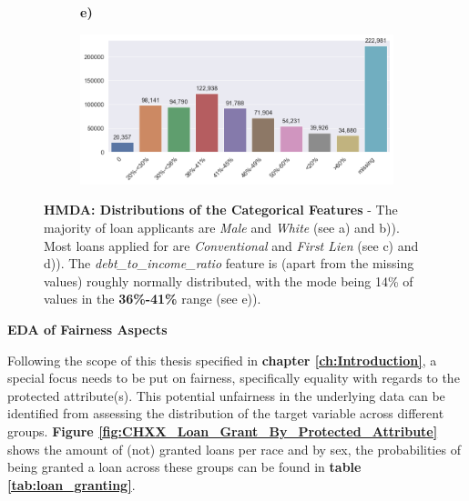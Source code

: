 \begin{figure}[!htbp]
\begin{minipage}[b]{0.5\textwidth}
\begin{subfigure}[t]{0.9\textwidth}
        \end{subfigure}
    \end{minipage}%
    \hfill\allowbreak%
    \begin{minipage}[b]{1\textwidth}
        \centering
        \begin{subfigure}[t]{0.06\textwidth}
            \textbf{e)}
        \end{subfigure}
        \begin{subfigure}[t]{0.92\textwidth}
            \includegraphics[width=\linewidth, valign=t]{images/HMDA_features/HMDA_features_dtir.png}
        \end{subfigure}
    \end{minipage}%

    \caption[HMDA: Distributions of the Categorical Features]{\textbf{HMDA: Distributions of the Categorical Features} - The majority of loan applicants are \textit{Male} and \textit{White} (see a) and b)). 
    Most loans applied for are \textit{Conventional} and \textit{First Lien} (see c) and d)). The \textit{debt\_to\_income\_ratio} feature is (apart from the missing values) roughly normally distributed, with the mode being 14\% of values in the \textbf{36\%-41\%} range (see e)).}
    \label{fig:HMDA_Categorical_Features_Distributions}

\end{figure}


\textbf{EDA of Fairness Aspects}

Following the scope of this thesis specified in \textbf{chapter \ref{ch:Introduction}}, a special focus needs to be put  on fairness, specifically equality with regards to the protected attribute(s).
This potential unfairness in the underlying data can be identified from assessing the distribution of the target variable across different groups.
\textbf{Figure \ref{fig:CHXX_Loan_Grant_By_Protected_Attribute}} shows the amount of (not) granted loans per race and by sex, the probabilities of being granted a loan across these groups can be found in \textbf{table \ref{tab:loan_granting}}.\@

